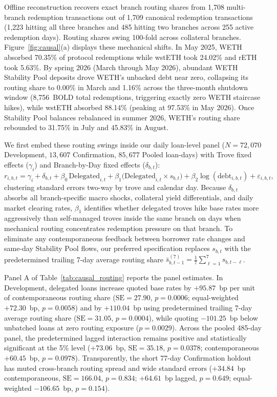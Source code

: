 Offline reconstruction recovers exact branch routing shares from 1,708 multi-branch redemption transactions out of 1,709 canonical redemption transactions (1,223 hitting all three branches and 485 hitting two branches across 255 active redemption days). Routing shares swing 100-fold across collateral branches. Figure~\ref{fig:causal}(a) displays these mechanical shifts. In May 2025, WETH absorbed 70.35\% of protocol redemptions while wstETH took 24.02\% and rETH took 5.63\%. By spring 2026 (March through May 2026), abundant WETH Stability Pool deposits drove WETH's unbacked debt near zero, collapsing its routing share to 0.00\% in March and 1.16\% across the three-month shutdown window (8,756~BOLD total redemptions, triggering exactly zero WETH staircase hikes), while wstETH absorbed 88.14\% (peaking at 97.53\% in May 2026). Once Stability Pool balances rebalanced in summer 2026, WETH's routing share rebounded to 31.75\% in July and 45.83\% in August.

We first embed these routing swings inside our daily loan-level panel ($N = 72{,}070$ Development, $13{,}607$ Confirmation, $85{,}677$ Pooled loan-days) with Trove fixed effects ($\gamma_i$) and Branch-by-Day fixed effects ($\delta_{b,t}$):
\begin{equation}\label{eq:trove_fe}
r_{i,b,t} = \gamma_i + \delta_{b,t} + \beta_0\,\text{Delegated}_{i,t} + \beta_1\bigl(\text{Delegated}_{i,t} \times s_{b,t}\bigr) + \beta_2 \log(\text{debt}_{i,b,t}) + \varepsilon_{i,b,t},
\end{equation}
clustering standard errors two-way by trove and calendar day. Because $\delta_{b,t}$ absorbs all branch-specific macro shocks, collateral yield differentials, and daily market clearing rates, $\beta_1$ identifies whether delegated troves hike base rates more aggressively than self-managed troves inside the same branch on days when mechanical routing concentrates redemption pressure on that branch. To eliminate any contemporaneous feedback between borrower rate changes and same-day Stability Pool flows, our preferred specification replaces $s_{b,t}$ with the predetermined trailing 7-day average routing share $\bar{s}_{b,t-1}^{(7)} = \frac{1}{7}\sum_{\ell=1}^{7} s_{b,t-\ell}$.

Panel A of Table~\ref{tab:causal_routing} reports the panel estimates. In Development, delegated loans increase quoted base rates by $+95.87$~bp per unit of contemporaneous routing share ($\text{SE} = 27.90$, $p = 0.0006$; equal-weighted $+72.30$~bp, $p = 0.0058$) and by $+110.04$~bp using predetermined trailing 7-day average routing share ($\text{SE} = 31.05$, $p = 0.0004$), while quoting $-101.25$~bp below unbatched loans at zero routing exposure ($p = 0.0029$). Across the pooled 485-day panel, the predetermined lagged interaction remains positive and statistically significant at the 5\% level ($+73.06$~bp, $\text{SE} = 35.18$, $p = 0.0378$; contemporaneous $+60.45$~bp, $p = 0.0978$). Transparently, the short 77-day Confirmation holdout has muted cross-branch routing spread and wide standard errors ($+34.84$~bp contemporaneous, $\text{SE} = 166.04$, $p = 0.834$; $+64.61$~bp lagged, $p = 0.649$; equal-weighted $-106.65$~bp, $p = 0.154$).

